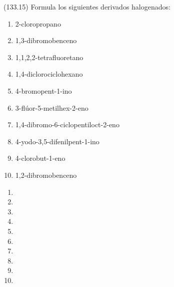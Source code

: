 \documentclass[10pt,a5paper,twoside]{article}
\begin{document}
  \begin{exercise}[
      tags    = {},
      topics  = {química, química orgánica, orgánica},
      source  = {FQ 1B MGH 2016, p133, e15},
    ]
    (133.15) Formula los siguientes derivados halogenados:
    \begin{enumerate}
      \item 2-cloropropano
      \item 1,3-dibromobenceno
      \item 1,1,2,2-tetrafluoretano
      \item 1,4-diclorociclohexano
      \item 4-bromopent-1-ino
      \item 3-flúor-5-metilhex-2-eno
      \item 1,4-dibromo-6-ciclopentiloct-2-eno
      \item 4-yodo-3,5-difenilpent-1-ino
      \item 4-clorobut-1-eno
      \item 1,2-dibromobenceno
    \end{enumerate}
  \end{exercise}

  \begin{solution}
    \begin{enumerate}
      \item {}
      \item {}
      \item {}
      \item {}
      \item {}
      \item {}
      \item {}
      \item {}
      \item {}
      \item {}
    \end{enumerate}
  \end{solution}
\end{document}
